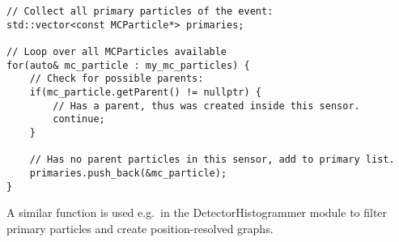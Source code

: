 \begin{description}
\begin{verbatim}
// Collect all primary particles of the event:
std::vector<const MCParticle*> primaries;

// Loop over all MCParticles available
for(auto& mc_particle : my_mc_particles) {
    // Check for possible parents:
    if(mc_particle.getParent() != nullptr) {
        // Has a parent, thus was created inside this sensor.
        continue;
    }

    // Has no parent particles in this sensor, add to primary list.
    primaries.push_back(&mc_particle);
}
\end{verbatim}

A similar function is used e.g.\ in the DetectorHistogrammer module to filter primary particles and create position-resolved graphs.
\end{description}

